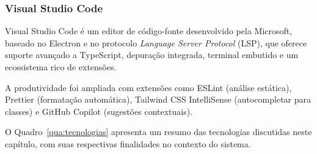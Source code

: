 \subsubsection{Visual Studio Code}
Visual Studio Code \cite{vscode2025} é um editor de código-fonte desenvolvido pela Microsoft, baseado no Electron e no protocolo \textit{Language Server Protocol} (LSP), que oferece suporte avançado a TypeScript, depuração integrada, terminal embutido e um ecossistema rico de extensões.

A produtividade foi ampliada com extensões como ESLint (análise estática), Prettier (formatação automática), Tailwind CSS IntelliSense (autocompletar para classes) e GitHub Copilot (sugestões contextuais).

\label{sec:sintese}

O Quadro~\ref{qua:tecnologias} apresenta um resumo das tecnologias discutidas neste capítulo, com suas respectivas finalidades no contexto do sistema.

